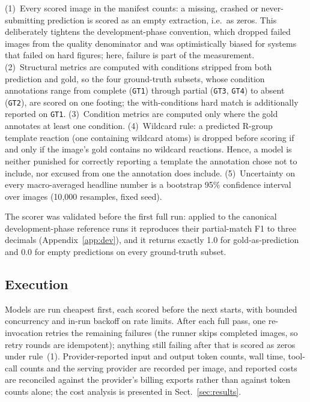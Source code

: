 \documentclass{article}
\begin{document}
(1)~Every scored image in the manifest counts: a missing, crashed or
never-submitting prediction is scored as an empty extraction, i.e.\ as
zeros. This deliberately tightens the development-phase convention,
which dropped failed images from the quality denominator and was
optimistically biased for systems that failed on hard figures; here,
failure is part of the measurement. (2)~Structural metrics are computed
with conditions stripped from both prediction and gold, so the four
ground-truth subsets, whose condition annotations range from complete
(\texttt{GT1}) through partial (\texttt{GT3}, \texttt{GT4}) to absent
(\texttt{GT2}), are scored on one footing; the with-conditions hard
match is additionally reported on \texttt{GT1}. (3)~Condition metrics
are computed only where the gold annotates at least one condition.
(4)~Wildcard rule: a predicted R-group template reaction (one
containing wildcard atoms) is dropped before scoring if and only if the
image's gold contains no wildcard reactions. Hence, a model is neither
punished for correctly reporting a template the annotation chose not to
include, nor excused from one the annotation does include.
(5)~Uncertainty on every macro-averaged headline number is a bootstrap
95\% confidence interval over images (10{,}000 resamples, fixed seed).

The scorer was validated before the first full run: applied to the
canonical development-phase reference runs it reproduces their
partial-match F1 to three decimals (Appendix~\ref{app:dev}), and it
returns exactly 1.0 for gold-as-prediction and 0.0 for empty
predictions on every ground-truth subset.

\subsection{Execution}
Models are run cheapest first, each scored before the next starts, with
bounded concurrency and in-run backoff on rate limits. After each full
pass, one re-invocation retries the remaining failures (the runner
skips completed images, so retry rounds are idempotent); anything still
failing after that is scored as zeros under rule~(1). Provider-reported
input and output token counts, wall time, tool-call counts and the
serving provider are recorded per image, and reported costs are
reconciled against the provider's billing exports rather than against
token counts alone; the cost analysis is presented in
Sect.~\ref{sec:results}.

\end{document}
